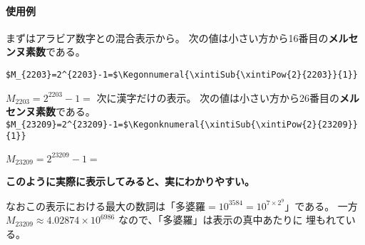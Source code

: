 \documentclass[dvipdfmx]{jsarticle}
\newif\ifSkipXint
\begin{document}
\paragraph{使用例}
まずはアラビア数字との混合表示から。
% 
% 
次の値は小さい方から16番目の\textbf{メルセンヌ素数}である。

\noindent\verb+$M_{2203}=2^{2203}-1=$\Kegonnumeral{\xintiSub{\xintiPow{2}{2203}}{1}}+
\par\noindent$M_{2203}=2^{2203}-1=$
\vfil
\noindent 次に漢字だけの表示。
次の値は小さい方から26番目の\textbf{メルセンヌ素数}である。
\newpage
\noindent\verb+$M_{23209}=2^{23209}-1=$\Kegonknumeral{\xintiSub{\xintiPow{2}{23209}}{1}}+
\par\noindent$M_{23209}=2^{23209}-1=$
\ifSkipXint
  \newread\MersenneFile \openin\MersenneFile=M23209.dat \read\MersenneFile to\TwentySixthMersennePrime \closein\MersenneFile
  \Kegonknumeral\TwentySixthMersennePrime
\else
\fi
\begin{center}\bfseries\large
このように実際に表示してみると、実にわかりやすい。
\end{center}
なおこの表示における最大の数詞は「$\text{多婆羅}=10^{3584}=10^{7\times2^9}$」である。
一方 $M_{23209}\approx 4.02874\times10^{6986}$ なので、「多婆羅」は表示の真中あたりに
埋もれている。
\end{document}

